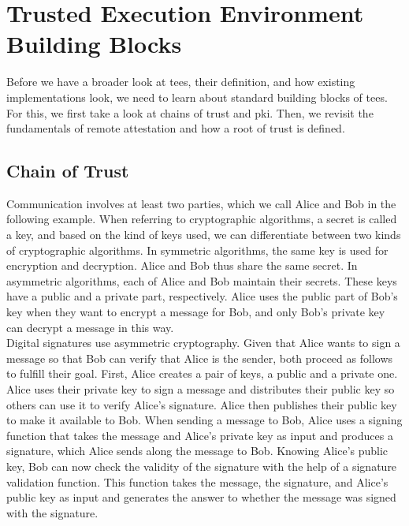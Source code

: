 \section{Trusted Execution Environment Building Blocks}
\label{sec:20:building_blocks}
Before we have a broader look at \glspl{tee}, their definition, and how existing
implementations look, we need to learn about standard building blocks of
\glspl{tee}. For this, we first take a look at chains of trust and \gls{pki}.
Then, we revisit the fundamentals of remote attestation and how a root of
trust is defined.

\subsection{Chain of Trust}
\label{sec:20:chain_of_trust}

Communication involves at least two parties, which we call Alice and Bob in the
following example. When referring to cryptographic algorithms, a secret is
called a key, and based on the kind of keys used, we can differentiate between
two kinds of cryptographic algorithms. In symmetric algorithms, the same key is
used for encryption and decryption. Alice and Bob thus share the same secret. In
asymmetric algorithms, each of Alice and Bob maintain their secrets. These keys
have a public and a private part, respectively. Alice uses the public part of
Bob's key when they want to encrypt a message for Bob, and only Bob's private
key can decrypt a message in this way.\\

Digital signatures use asymmetric cryptography. Given that Alice wants to sign a
message so that Bob can verify that Alice is the sender, both proceed as follows
to fulfill their goal. First, Alice creates a pair of keys, a public and a
private one. Alice uses their private key to sign a message and distributes
their public key so others can use it to verify Alice's signature. Alice then
publishes their public key to make it available to Bob. When sending a message
to Bob, Alice uses a signing function that takes the message and Alice's private
key as input and produces a signature, which Alice sends along the message to
Bob. Knowing Alice's public key, Bob can now check the validity of the signature
with the help of a signature validation function. This function takes the
message, the signature, and Alice's public key as input and generates the answer
to whether the message was signed with the signature.\\

